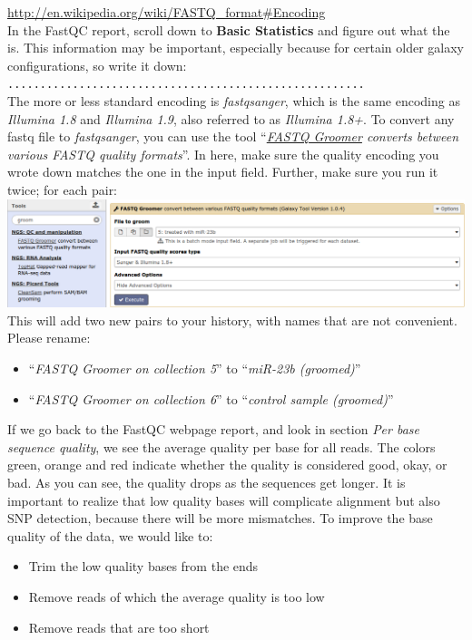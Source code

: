 \url{http://en.wikipedia.org/wiki/FASTQ\_format#Encoding}\\
In the FastQC report, scroll down to \textbf{Basic Statistics} and figure out what the  is. This information may be important, especially because for certain older galaxy configurations, so write it down:\\
\verb|.......................................................|\\
The more or less standard encoding is \textit{fastqsanger}, which is the same encoding as \textit{Illumina 1.8} and \textit{Illumina 1.9}, also referred to as \textit{Illumina 1.8+}. To convert any fastq file to \textit{fastqsanger}, you can use the tool ``\textit{\underline{FASTQ Groomer} converts between various FASTQ quality formats}''. In here, make sure the quality encoding you wrote down matches the one in the input field. Further, make sure you run it twice; for each pair:\\
\includegraphics[width=\textwidth]{figures/qc_05.png}\\
This will add two new pairs to your history, with names that are not convenient. Please rename:
\begin{itemize}
	\item ``\textit{FASTQ Groomer on collection 5}'' to ``\textit{miR-23b (groomed)}''
	\item ``\textit{FASTQ Groomer on collection 6}'' to ``\textit{control sample (groomed)}''
\end{itemize}
If we go back to the FastQC webpage report, and look in section \textit{Per base sequence quality}, we see the average quality per base for all reads. The colors green, orange and red indicate whether the quality is considered good, okay, or bad. As you can see, the quality drops as the sequences get longer. It is important to realize that low quality bases will complicate alignment but also SNP detection, because there will be more mismatches. To improve the base quality of the data, we would like to:
\begin{itemize}
	\item Trim the low quality bases from the ends
	\item Remove reads of which the average quality is too low
	\item Remove reads that are too short
\end{itemize}
